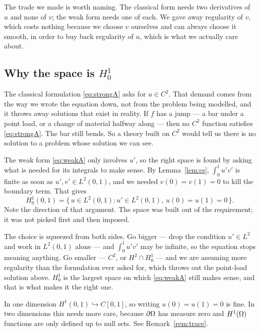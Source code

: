 \documentclass[11pt,a4paper]{article}
\begin{document}
The trade we made is worth naming. The classical form needs two derivatives of
$u$ and none of $v$; the weak form needs one of each. We gave away regularity of
$v$, which costs nothing because we choose $v$ ourselves and can always choose it
smooth, in order to buy back regularity of $u$, which is what we actually care
about.

\subsection{Why the space is $H^1_0$}
\label{sec:space-choice}

The classical formulation \eqref{eq:strongA} asks for $u \in C^{2}$. That demand
comes from the way we wrote the equation down, not from the problem being
modelled, and it throws away solutions that exist in reality. If $f$ has a jump
--- a bar under a point load, or a change of material halfway along --- then no
$C^{2}$ function satisfies \eqref{eq:strongA}. The bar still bends. So a theory
built on $C^{2}$ would tell us there is no solution to a problem whose solution
we can see.

The weak form \eqref{eq:weakA} only involves $u'$, so the right space is found by
asking what is needed for its integrals to make sense. By Lemma~\ref{lem:cs},
$\int_0^1 u'v'$ is finite as soon as $u', v' \in L^{2}(0,1)$, and we needed
$v(0)=v(1)=0$ to kill the boundary term. That gives
\[
  H^1_0(0,1) = \{\, u \in L^{2}(0,1) : u' \in L^{2}(0,1),\ u(0)=u(1)=0 \,\} .
\]
Note the direction of that argument. The space was built out of the requirement;
it was not picked first and then imposed.

The choice is squeezed from both sides. Go bigger --- drop the condition
$u' \in L^{2}$ and work in $L^{2}(0,1)$ alone --- and $\int_0^1 u'v'$ may be
infinite, so the equation stops meaning anything. Go smaller --- $C^{2}$, or
$H^{2} \cap H^1_0$ --- and we are assuming more regularity than the formulation
ever asked for, which throws out the point-load solution above. $H^1_0$ is the
largest space on which \eqref{eq:weakA} still makes sense, and that is what makes
it the right one.

\begin{remark}
In one dimension $H^{1}(0,1) \hookrightarrow C[0,1]$, so writing
$u(0)=u(1)=0$ is fine. In two dimensions this needs more care, because $\partial\Omega$
has measure zero and $H^{1}(\Omega)$ functions are only defined up to null sets. See
Remark~\ref{rem:trace}.
\end{remark}
\end{document}
